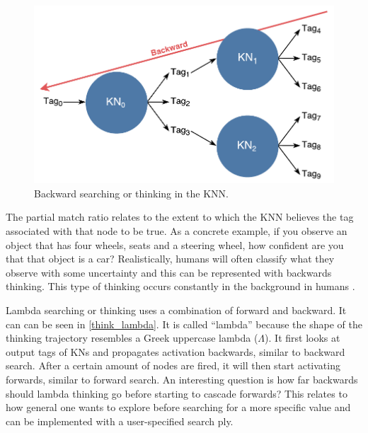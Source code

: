 \documentclass[titlepage,11pt]{article}
\begin{document}
\begin{figure}[!htb]
	\includegraphics[width=\columnwidth]{figures/backward_search.pdf}
	\caption{Backward searching or thinking in the KNN.}
	\label{think_backwards}
\end{figure}

The partial match ratio relates to the extent to which the KNN believes the tag associated with that node to be true. As a concrete example, if you observe an object that has four wheels, seats and a steering wheel, how confident are you that that object is a car? Realistically, humans will often classify what they observe with some uncertainty \cite{uncertainty} and this can be represented with backwards thinking. This type of thinking occurs constantly in the background in humans \cite{vybihal-knowledge}.

Lambda searching or thinking uses a combination of forward and backward. It can can be seen in \autoref{think_lambda}. It is called ``lambda'' because the shape of the thinking trajectory resembles a Greek uppercase lambda ($\Lambda$). It first looks at output tags of KNs and propagates activation backwards, similar to backward search. After a certain amount of nodes are fired, it will then start activating forwards, similar to forward search. An interesting question is how far backwards should lambda thinking go before starting to cascade forwards? This relates to how general one wants to explore before searching for a more specific value and can be implemented with a user-specified search ply.
\end{document}
